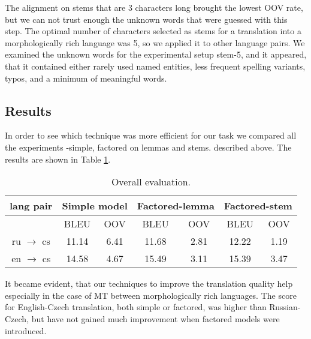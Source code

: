 \documentclass[11pt,letterpaper]{article}
\begin{document}
The alignment on stems that are 3 characters long brought the lowest OOV rate,
but we can not trust enough the unknown words that were guessed with this step.
The optimal number of characters selected as stems for a translation into a morphologically rich 
language was 5, so we applied it to other language pairs.
We examined the unknown words for the experimental setup stem-5, and it appeared, that it contained either 
rarely used named entities, less frequent spelling variants, typos, and a minimum of meaningful words. 


\subsection{Results}

In order to see which technique was more efficient for our 
task we compared all the experiments -simple, factored on lemmas and stems. 
described above. The results are shown in Table \ref{tab:overall}.
\begin{table}
\begin{center}
\begin{tabular} {ccccccc}
\hline
lang pair &\multicolumn{2}{c}{Simple model} & \multicolumn{2}{c}{Factored-lemma} & \multicolumn{2}{c}{Factored-stem}\\ \hline
                       & BLEU   &OOV    & BLEU   & OOV & BLEU  & OOV \\ \hline
ru $\rightarrow$ cs    & 11.14  &6.41   &11.68   &2.81 & 12.22 &1.19 \\ %
en $\rightarrow$ cs    & 14.58  &4.67   &15.49   &3.11 & 15.39  &3.47  \\ \hline %
\end{tabular}
\end{center}
\caption{Overall evaluation.}
\label{tab:overall}
\end{table}

It became evident, that our techniques to improve the translation quality help especially in the
case of MT between morphologically rich languages. The score for English-Czech translation, both simple
or factored, was higher than Russian-Czech, but have not gained much improvement when 
factored models were introduced. 
\end{document}
